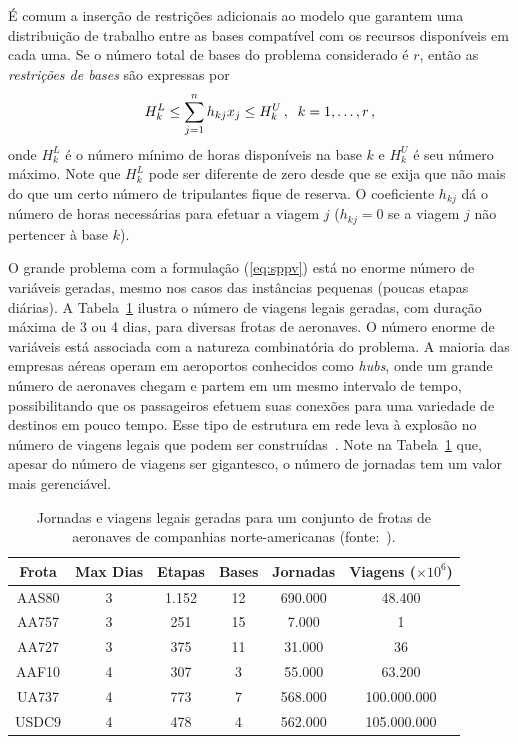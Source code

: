 É comum a inserção de restrições adicionais ao modelo que garantem uma distribuição de trabalho
entre as bases compatível com os recursos disponíveis em cada uma. Se o número total de bases do
problema considerado é $r$, então as \emph{restrições de bases} são expressas por
%
\begin{equation} \label{eq:bases}
	H_k^L \leq \sum_{j=1}^n h_{kj} x_j \leq H_k^U \, , \;\; k = 1, \ldots, r \, ,
\end{equation}
%
onde $H_k^L$ é o número mínimo de horas disponíveis na base $k$ e $H_k^U$ é seu número máximo. 
Note que $H_k^L$ pode ser diferente de zero desde que se exija que não mais do que um certo número 
de tripulantes fique de reserva. O coeficiente $h_{kj}$ dá o número de horas necessárias para 
efetuar a viagem $j$ ($h_{kj} = 0$ se a viagem $j$ não pertencer à base $k$).

O grande problema com a formulação (\ref{eq:sppv}) está no enorme número de variáveis geradas, mesmo
nos casos das instâncias pequenas (poucas etapas diárias). A Tabela~\ref{tab:viagens} ilustra o
número de viagens legais geradas, com duração máxima de 3 ou 4 dias, para diversas frotas de
aeronaves. O número enorme de variáveis está associada com a natureza combinatória do problema. A
maioria das empresas aéreas operam em aeroportos conhecidos como \emph{hubs}, onde um grande número
de aeronaves chegam e partem em um mesmo intervalo de tempo, possibilitando que os passageiros
efetuem suas conexões para uma variedade de destinos em pouco tempo. Esse tipo de estrutura em rede 
leva à explosão no número de viagens legais que podem ser construídas~\cite{graves93}. Note na
Tabela~\ref{tab:viagens} que, apesar do número de viagens ser gigantesco, o número de 
jornadas tem um valor mais gerenciável.

\begin{table}[ht]
	\begin{center}
		\begin{tabular}{|c||c|c|c|c|c|}
			\hline
			{\bf Frota} & {\bf Max Dias} & {\bf Etapas} & {\bf Bases} & {\bf Jornadas} & 
			{\bf Viagens} ($\times 10^6$) \\
			\hline
			AAS80 & 3 & 1.152 & 12 & 690.000 & 48.400 \\
			\hline
			AA757 & 3 & 251 & 15 & 7.000 & 1 \\
			\hline
			AA727 & 3 & 375 & 11 & 31.000 & 36 \\
			\hline
			AAF10 & 4 & 307 & 3 & 55.000 & 63.200 \\
			\hline 
			UA737 & 4 & 773 & 7 & 568.000 & 100.000.000 \\
			\hline
			USDC9 & 4 & 478 & 4 & 562.000 & 105.000.000 \\
			\hline
		\end{tabular}
		\caption{Jornadas e viagens legais geradas para um conjunto de frotas de aeronaves de companhias
		norte-americanas (fonte:~\cite{anbil98}).}
		\label{tab:viagens}
	\end{center}
\end{table}

